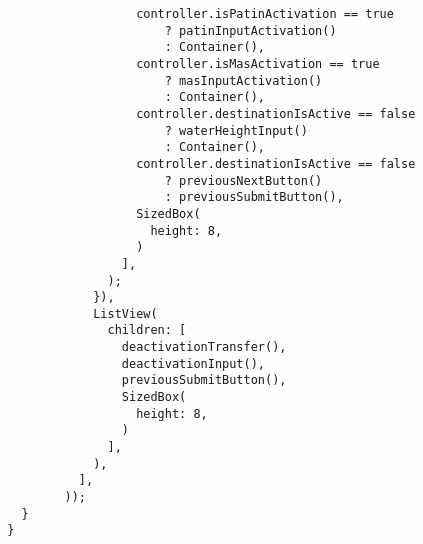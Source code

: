 \begin{lstlisting}
                          controller.isPatinActivation == true
                              ? patinInputActivation()
                              : Container(),
                          controller.isMasActivation == true
                              ? masInputActivation()
                              : Container(),
                          controller.destinationIsActive == false
                              ? waterHeightInput()
                              : Container(),
                          controller.destinationIsActive == false
                              ? previousNextButton()
                              : previousSubmitButton(),
                          SizedBox(
                            height: 8,
                          )
                        ],
                      );
                    }),
                    ListView(
                      children: [
                        deactivationTransfer(),
                        deactivationInput(),
                        previousSubmitButton(),
                        SizedBox(
                          height: 8,
                        )
                      ],
                    ),
                  ],
                ));
          }
        }
        

	\end{lstlisting}

